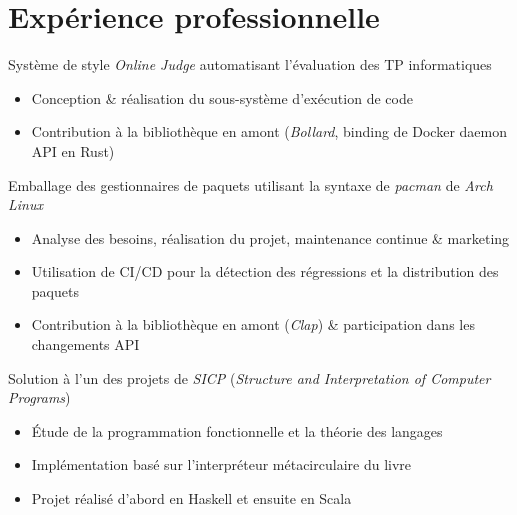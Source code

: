 \documentclass{resume}
\begin{document}
\section{Expérience professionnelle}
Système de style \textit{Online Judge} automatisant l'évaluation des TP informatiques
\begin{itemize}
  \item Conception \& réalisation du sous-système d'exécution de code
  \item Contribution à la bibliothèque en amont (\textit{Bollard}, binding de Docker daemon API en Rust)
\end{itemize}

Emballage des gestionnaires de paquets utilisant la syntaxe de \textit{pacman} de \textit{Arch Linux}
\begin{itemize}
  \item Analyse des besoins, réalisation du projet, maintenance continue \& marketing
  \item Utilisation de CI/CD pour la détection des régressions et la distribution des paquets
  \item Contribution à la bibliothèque en amont (\textit{Clap}) \& participation dans les changements API
\end{itemize}

Solution à l'un des projets de \textit{SICP} (\textit{Structure and Interpretation of Computer Programs})
\begin{itemize}
  \item Étude de la programmation fonctionnelle et la théorie des langages
  \item Implémentation basé sur l'interpréteur métacirculaire du livre
  \item Projet réalisé d'abord en Haskell et ensuite en Scala
\end{itemize}

\end{document}
